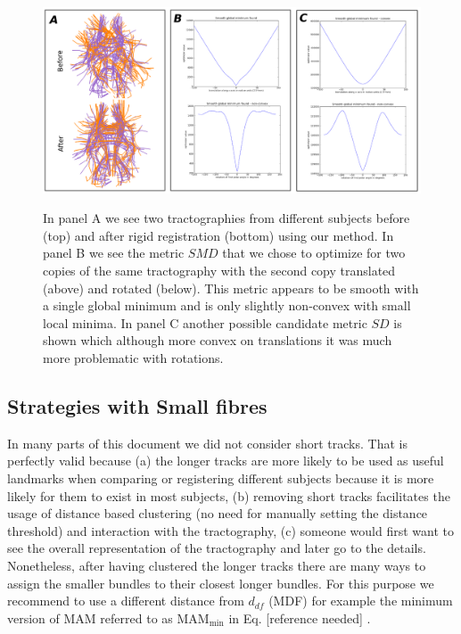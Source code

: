 \documentclass[preprint,authoryear,a4paper,10pt,onecolumn]{elsarticle}
\begin{document}
%
\begin{figure}
\begin{centering}
\label{Flo:direct_registration}\includegraphics[scale=0.8]{last_figures/LSC_registration2}
\par\end{centering}

\caption{In panel A we see two tractographies from different subjects
  before (top) and after rigid registration (bottom) using our
  method. In panel B we see the metric $SMD$ that we chose to optimize
  for two copies of the same tractography with the second copy
  translated (above) and rotated (below). This metric appears to be
  smooth with a single global minimum and is only slightly non-convex
  with small local minima. In panel C another possible candidate metric
  $SD$ is shown which although more convex on translations it was much
  more problematic with rotations.}

\end{figure}

\subsection{Strategies with Small fibres}

In many parts of this document we did not consider short tracks. That
is perfectly valid because (a) the longer tracks are more likely to
be used as useful landmarks when comparing or registering different
subjects because it is more likely for them to exist in most subjects,
(b) removing short tracks facilitates the usage of distance based
clustering (no need for manually setting the distance threshold) and
interaction with the tractography, (c) someone would first want to
see the overall representation of the tractography and later go to
the details. Nonetheless, after having clustered the longer tracks
there are many ways to assign the smaller bundles to their closest
longer bundles. For this purpose we recommend to use a different distance
from $d_{df}$ (MDF) for example the minimum version of MAM referred
to as $\textrm{MAM}_{\textrm{min}}$ in Eq. [reference needed]
. 
\end{document}
